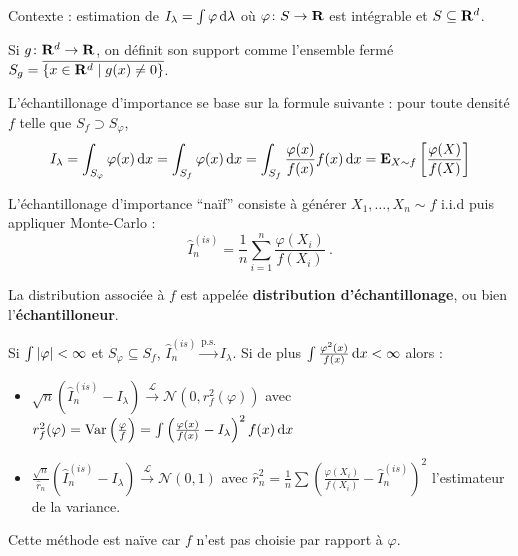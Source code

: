 Contexte : estimation de $I_\lambda = \int \varphi \mathop{}\mathopen{}\mathrm{d} \lambda$ où $\varphi \colon S \to \mathbf{R}$ est intégrable et $S \subseteq \mathbf{R}^d$.

\begin{defn}
	Si $g \colon \mathbf{R}^d \to \mathbf{R}$, on définit son support comme l'ensemble fermé $S_g = \overline{\{ x \in \mathbf{R}^d \mid g(x) \neq 0 \} }$.
\end{defn}

L'échantillonage d'importance se base sur la formule suivante : pour toute densité $f$ telle que $S_f \supset S_{\varphi}$,
$$I_\lambda = \int_{S_{\varphi}} \varphi(x) \mathop{}\mathopen{}\mathrm{d} x = \int_{S_f} \varphi(x) \mathop{}\mathopen{}\mathrm{d} x = \int_{S_f} \frac{\varphi(x)}{f(x)} f(x) \mathop{}\mathopen{}\mathrm{d} x = \mathbf{E}_{X \sim f} \left[  \frac{\varphi(X)}{f(X)} \right]$$

L'échantillonage d'importance “naïf” consiste à générer $X_1,\ldots,X_n \sim f$ i.i.d puis appliquer Monte-Carlo :
$$\hat{I}_n^{(is)} = \frac{1}{n} \sum_{i = 1}^n \frac{\varphi(X_i)}{f(X_i)}\ .$$

La distribution associée à $f$ est appelée \textbf{distribution d'échantillonage}, ou bien l'\textbf{échantilloneur}.

\begin{pop}
	Si $\int \left\lvert\varphi\right\rvert < \infty$ et $S_\varphi \subseteq S_f$, $\hat{I}_n^{(is)} \overset{\text{p.s.}}{\longrightarrow} I_\lambda$.
	Si de plus $\int \frac{\varphi^2(x)}{f(x)} \mathop{}\mathopen{}\mathrm{d} x < \infty$ alors :
	\begin{itemize}
		\item[\textbullet] $\sqrt{n} \left( \hat{I}_n^{(is)} - I_\lambda \right) \overset{\mathcal{L}}{\longrightarrow} \mathcal{N} \left(0,r_f^2(\varphi) \right)$ avec $r_f^2(\varphi) = \operatorname{Var} \left( \frac{\varphi}{f} \right) = \int \left( \frac{\varphi(x)}{f(x)} - I_\lambda \right)^2 f(x) \mathop{}\mathopen{}\mathrm{d} x$
		\item[\textbullet] $\frac{\sqrt{n}}{\hat{r}_n} \left( \hat{I}_n^{(is)} - I_\lambda \right) \overset{\mathcal{L}}{\longrightarrow} \mathcal{N}(0,1)$ avec $\hat{r}_n^2 = \frac{1}{n} \sum \left( \frac{\varphi(X_i)}{f(X_i)} - \hat{I}_n^{(is)} \right)^2$ l'estimateur de la variance.
	\end{itemize}
\end{pop}

Cette méthode est naïve car $f$ n'est pas choisie par rapport à $\varphi$.

